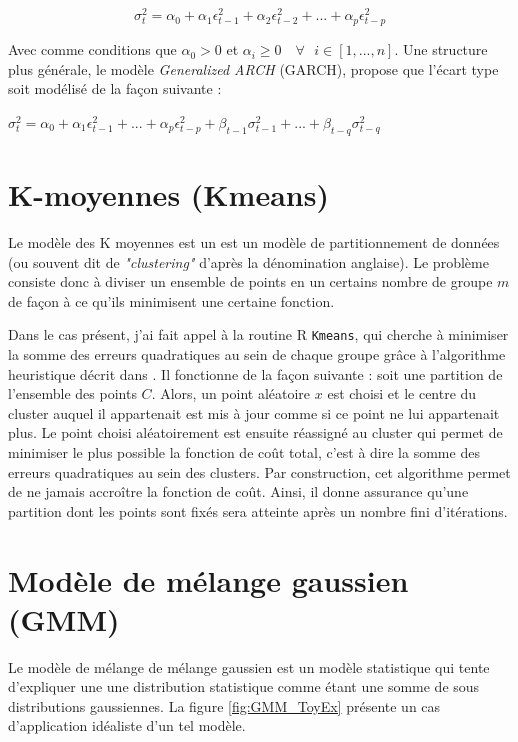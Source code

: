 \documentclass[12pt]{report}
\begin{document}
\begin{equation}
\sigma_t^2 = \alpha_0 + \alpha_1  \epsilon_{t-1}^2 + \alpha_2  \epsilon_{t-2}^2 + ... + \alpha_p  \epsilon_{t-p}^2 
\label{ARCH}
\end{equation}

Avec comme conditions que $\alpha_0 > 0$ et $\alpha_i \geq 0 \quad \forall \text{ } i \in [1,...,n] $. Une structure plus générale, le modèle \textit{Generalized ARCH} (GARCH), propose que l’écart type soit modélisé de la façon suivante :

$ \sigma_t^2 = \alpha_0 + \alpha_1  \epsilon_{t-1}^2 + ... + \alpha_p  \epsilon_{t-p}^2
+ \beta_{t-1} \sigma^2_{t-1} + ... + \beta_{t-q} \sigma^2_{t-q}$

\section{K-moyennes (Kmeans)}
\label{sec:Kmeans}

Le modèle des K moyennes est un est un modèle de partitionnement de données (ou souvent dit de \textit{"clustering"} d'après la dénomination anglaise). Le problème consiste donc à diviser un ensemble de points en un certains nombre de groupe $m$ de façon à ce qu'ils minimisent une certaine fonction.

Dans le cas présent, j'ai fait appel à la routine R \texttt{Kmeans}, qui cherche à minimiser la somme des erreurs quadratiques au sein de chaque groupe grâce à l'algorithme heuristique décrit dans \cite{hartigan_algorithm_1979}. Il fonctionne de la façon suivante : soit une partition de l'ensemble des points $C$. Alors, un point aléatoire $x$ est choisi et le centre du cluster auquel il appartenait est mis à jour comme si ce point ne lui appartenait plus. Le point choisi aléatoirement est ensuite réassigné au cluster qui permet de minimiser le plus possible la fonction de coût total, c'est à dire la somme des erreurs quadratiques au sein des clusters. Par construction, cet algorithme permet de ne jamais accroître la fonction de coût. Ainsi, il donne assurance qu'une partition dont les points sont fixés sera atteinte après un nombre fini d'itérations.

\section{Modèle de mélange gaussien (GMM)}
\label{sec:Model_GMM}
Le modèle de mélange de mélange gaussien est un modèle statistique qui tente d'expliquer une une distribution statistique comme étant une somme de sous distributions gaussiennes. La figure \ref{fig:GMM_ToyEx} présente un cas d'application idéaliste d'un tel modèle. 
\end{document}
